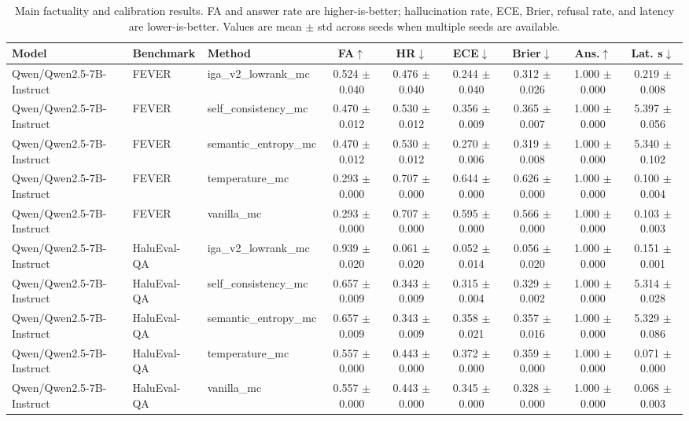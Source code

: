 \begin{table}[t]
\centering
\caption{Main factuality and calibration results. FA and answer rate are higher-is-better; hallucination rate, ECE, Brier, refusal rate, and latency are lower-is-better. Values are mean $\pm$ std across seeds when multiple seeds are available.}
\label{tab:main_results}
\small
\begin{tabular}{lllcccccc}
\toprule
Model & Benchmark & Method & FA$\uparrow$ & HR$\downarrow$ & ECE$\downarrow$ & Brier$\downarrow$ & Ans.$\uparrow$ & Lat. s$\downarrow$ \\
\midrule
Qwen/Qwen2.5-7B-Instruct & FEVER & iga\_v2\_lowrank\_mc & 0.524 $\pm$ 0.040 & 0.476 $\pm$ 0.040 & 0.244 $\pm$ 0.040 & 0.312 $\pm$ 0.026 & 1.000 $\pm$ 0.000 & 0.219 $\pm$ 0.008 \\
Qwen/Qwen2.5-7B-Instruct & FEVER & self\_consistency\_mc & 0.470 $\pm$ 0.012 & 0.530 $\pm$ 0.012 & 0.356 $\pm$ 0.009 & 0.365 $\pm$ 0.007 & 1.000 $\pm$ 0.000 & 5.397 $\pm$ 0.056 \\
Qwen/Qwen2.5-7B-Instruct & FEVER & semantic\_entropy\_mc & 0.470 $\pm$ 0.012 & 0.530 $\pm$ 0.012 & 0.270 $\pm$ 0.006 & 0.319 $\pm$ 0.008 & 1.000 $\pm$ 0.000 & 5.340 $\pm$ 0.102 \\
Qwen/Qwen2.5-7B-Instruct & FEVER & temperature\_mc & 0.293 $\pm$ 0.000 & 0.707 $\pm$ 0.000 & 0.644 $\pm$ 0.000 & 0.626 $\pm$ 0.000 & 1.000 $\pm$ 0.000 & 0.100 $\pm$ 0.004 \\
Qwen/Qwen2.5-7B-Instruct & FEVER & vanilla\_mc & 0.293 $\pm$ 0.000 & 0.707 $\pm$ 0.000 & 0.595 $\pm$ 0.000 & 0.566 $\pm$ 0.000 & 1.000 $\pm$ 0.000 & 0.103 $\pm$ 0.003 \\
Qwen/Qwen2.5-7B-Instruct & HaluEval-QA & iga\_v2\_lowrank\_mc & 0.939 $\pm$ 0.020 & 0.061 $\pm$ 0.020 & 0.052 $\pm$ 0.014 & 0.056 $\pm$ 0.020 & 1.000 $\pm$ 0.000 & 0.151 $\pm$ 0.001 \\
Qwen/Qwen2.5-7B-Instruct & HaluEval-QA & self\_consistency\_mc & 0.657 $\pm$ 0.009 & 0.343 $\pm$ 0.009 & 0.315 $\pm$ 0.004 & 0.329 $\pm$ 0.002 & 1.000 $\pm$ 0.000 & 5.314 $\pm$ 0.028 \\
Qwen/Qwen2.5-7B-Instruct & HaluEval-QA & semantic\_entropy\_mc & 0.657 $\pm$ 0.009 & 0.343 $\pm$ 0.009 & 0.358 $\pm$ 0.021 & 0.357 $\pm$ 0.016 & 1.000 $\pm$ 0.000 & 5.329 $\pm$ 0.086 \\
Qwen/Qwen2.5-7B-Instruct & HaluEval-QA & temperature\_mc & 0.557 $\pm$ 0.000 & 0.443 $\pm$ 0.000 & 0.372 $\pm$ 0.000 & 0.359 $\pm$ 0.000 & 1.000 $\pm$ 0.000 & 0.071 $\pm$ 0.000 \\
Qwen/Qwen2.5-7B-Instruct & HaluEval-QA & vanilla\_mc & 0.557 $\pm$ 0.000 & 0.443 $\pm$ 0.000 & 0.345 $\pm$ 0.000 & 0.328 $\pm$ 0.000 & 1.000 $\pm$ 0.000 & 0.068 $\pm$ 0.003 \\

\end{tabular}
\end{table}
